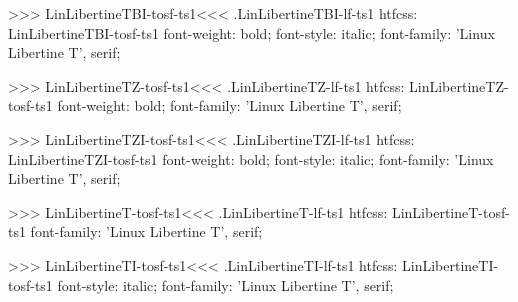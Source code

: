 {{{{{{{>>>
\<LinLibertineTBI-tosf-ts1\><<<
.LinLibertineTBI-lf-ts1
htfcss:  LinLibertineTBI-tosf-ts1  font-weight: bold; font-style: italic; font-family: 'Linux Libertine T', serif;

>>>
\<LinLibertineTZ-tosf-ts1\><<<
.LinLibertineTZ-lf-ts1
htfcss:  LinLibertineTZ-tosf-ts1  font-weight: bold; font-family: 'Linux Libertine T', serif;

>>>
\<LinLibertineTZI-tosf-ts1\><<<
.LinLibertineTZI-lf-ts1
htfcss:  LinLibertineTZI-tosf-ts1  font-weight: bold; font-style: italic; font-family: 'Linux Libertine T', serif;

>>>
\<LinLibertineT-tosf-ts1\><<<
.LinLibertineT-lf-ts1
htfcss:  LinLibertineT-tosf-ts1  font-family: 'Linux Libertine T', serif;

>>>
\<LinLibertineTI-tosf-ts1\><<<
.LinLibertineTI-lf-ts1
htfcss:  LinLibertineTI-tosf-ts1  font-style: italic; font-family: 'Linux Libertine T', serif;

}}}}}}}
